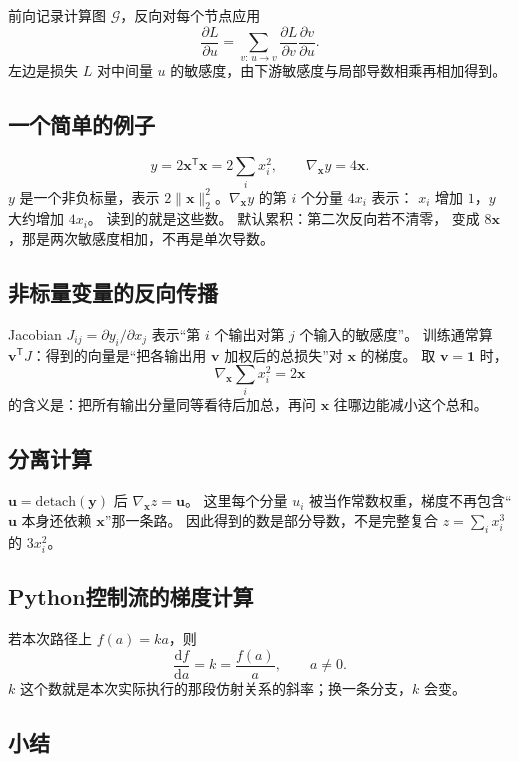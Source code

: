 前向记录计算图 $\mathcal{G}$，反向对每个节点应用
\[
\frac{\partial L}{\partial u}
=
\sum_{v:\,u\to v}
\frac{\partial L}{\partial v}
\frac{\partial v}{\partial u}.
\]
左边是损失 $L$ 对中间量 $u$ 的敏感度，由下游敏感度与局部导数相乘再相加得到。

\subsection{一个简单的例子}

\[
y=2\bm{x}^{\mathsf T}\bm{x}=2\sum_i x_i^2,
\qquad
\nabla_{\bm{x}}y=4\bm{x}.
\]
$y$ 是一个非负标量，表示 $2\|\bm{x}\|_2^2$。$\nabla_{\bm{x}}y$ 的第 $i$ 个分量 $4x_i$ 表示：
$x_i$ 增加 $1$，$y$ 大约增加 $4x_i$。 读到的就是这些数。
默认累积：第二次反向若不清零， 变成 $8\bm{x}$，那是两次敏感度相加，不再是单次导数。

\subsection{非标量变量的反向传播}

Jacobian $J_{ij}=\partial y_i/\partial x_j$ 表示“第 $i$ 个输出对第 $j$ 个输入的敏感度”。
训练通常算 $\bm{v}^{\mathsf T}J$：得到的向量是“把各输出用 $\bm{v}$ 加权后的总损失”对 $\bm{x}$ 的梯度。
取 $\bm{v}=\bm{1}$ 时，
\[
\nabla_{\bm{x}}\sum_i x_i^2=2\bm{x}
\]
的含义是：把所有输出分量同等看待后加总，再问 $\bm{x}$ 往哪边能减小这个总和。

\subsection{分离计算}

$\bm{u}=\mathrm{detach}(\bm{y})$ 后 $\nabla_{\bm{x}}z=\bm{u}$。
这里每个分量 $u_i$ 被当作常数权重，梯度不再包含“$\bm{u}$ 本身还依赖 $\bm{x}$”那一条路。
因此得到的数是部分导数，不是完整复合 $z=\sum_i x_i^3$ 的 $3x_i^2$。

\subsection{Python控制流的梯度计算}

若本次路径上 $f(a)=ka$，则
\[
\frac{\mathrm{d}f}{\mathrm{d}a}=k=\frac{f(a)}{a},\qquad a\neq 0.
\]
$k$ 这个数就是本次实际执行的那段仿射关系的斜率；换一条分支，$k$ 会变。

\subsection{小结}

